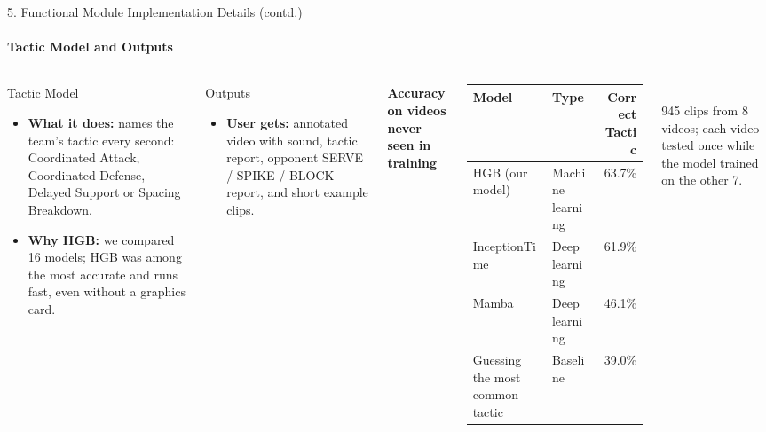 \documentclass[aspectratio=169, 11pt]{beamer}
\begin{document}
\begin{frame}{5. Functional Module Implementation Details (contd.)}
    \framesubtitle{Tactic Model and Outputs}
\begin{columns}[T]
\begin{block}{Tactic Model}
\scriptsize
\begin{itemize}
  \item \textbf{What it does:} names the team's tactic every second: Coordinated Attack, Coordinated Defense, Delayed Support or Spacing Breakdown.
  \item \textbf{Why HGB:} we compared 16 models; HGB was among the most accurate and runs fast, even without a graphics card.
\end{itemize}
\end{block}
\begin{block}{Outputs}
\scriptsize
\begin{itemize}
  \item \textbf{User gets:} annotated video with sound, tactic report, opponent SERVE / SPIKE / BLOCK report, and short example clips.
\end{itemize}
\end{block}
\centering
{\scriptsize \textbf{Accuracy on videos never seen in training}}\\[0.1cm]
\scriptsize
\begin{tabular}{llr}
\toprule
\textbf{Model} & \textbf{Type} & \textbf{Correct Tactic} \\
\midrule
HGB (our model) & Machine learning & 63.7\% \\
InceptionTime & Deep learning & 61.9\% \\
Mamba & Deep learning & 46.1\% \\
Guessing the most common tactic & Baseline & 39.0\% \\
\bottomrule
\end{tabular}\\[0.1cm]
{\tiny 945 clips from 8 videos; each video tested once while the model trained on the other 7.}
\end{columns}
\end{frame}
\end{document}
